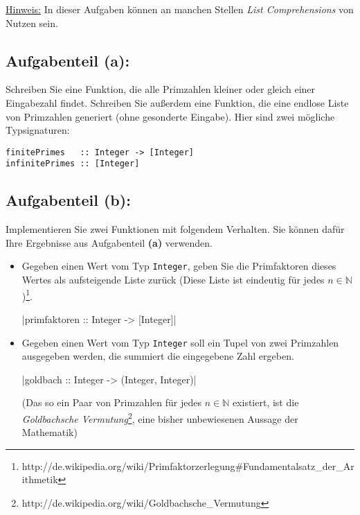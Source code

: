 \documentclass[a4paper,10pt]{scrartcl}
\begin{document}
\underline{Hinweis:} In dieser Aufgaben können an manchen Stellen \emph{List Comprehensions} von Nutzen sein.

\subsection*{Aufgabenteil (a):}

Schreiben Sie eine Funktion, die alle Primzahlen kleiner oder gleich einer Eingabezahl findet. Schreiben Sie außerdem eine Funktion, die eine endlose Liste von Primzahlen generiert (ohne gesonderte Eingabe).
Hier sind zwei mögliche Typsignaturen:

\begin{verbatim}
finitePrimes   :: Integer -> [Integer]
infinitePrimes :: [Integer]
\end{verbatim}

\subsection*{Aufgabenteil (b):}

Implementieren Sie zwei Funktionen mit folgendem Verhalten. Sie können dafür Ihre Ergebnisse aus Aufgabenteil \textbf{(a)} verwenden.

\begin{itemize}
\item Gegeben einen Wert vom Typ \texttt{Integer}, geben Sie die Primfaktoren dieses Wertes
      als aufsteigende Liste zurück (Diese Liste ist eindeutig für jedes $n \in \mathbb{N}$)\footnote{http://de.wikipedia.org/wiki/Primfaktorzerlegung\#Fundamentalsatz\_der\_Arithmetik}.

      |primfaktoren :: Integer -> [Integer]|

\item Gegeben einen Wert vom Typ \texttt{Integer} soll ein Tupel von zwei Primzahlen ausgegeben
      werden, die summiert die eingegebene Zahl ergeben.

      |goldbach :: Integer -> (Integer, Integer)|
      
      (Das so ein Paar von Primzahlen für jedes $n \in \mathbb{N}$ existiert, ist die 
      \emph{Goldbachsche Vermutung}\footnote{http://de.wikipedia.org/wiki/Goldbachsche\_Vermutung}, 
      eine bisher unbewiesenen Aussage der Mathematik)
\end{itemize}
\end{document}
